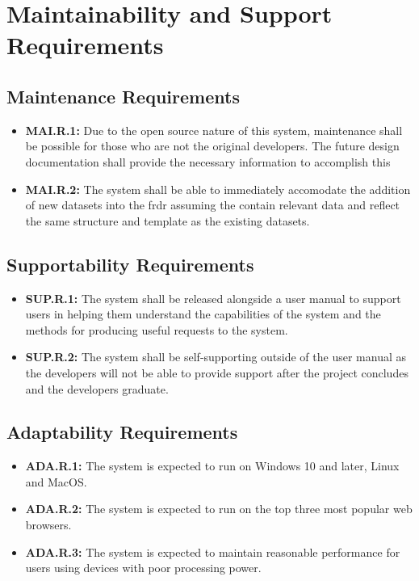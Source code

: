 \documentclass[12pt]{article}
\begin{document}
\section{Maintainability and Support Requirements}
\subsection{Maintenance Requirements}

\begin{itemize}
    \item \textbf{MAI.R.1:}\label{req:mai.r.1} Due to the open source nature of this system, maintenance shall be possible for those who are not the original developers.
    The future design documentation shall provide the necessary information to accomplish this
    \item \textbf{MAI.R.2:}\label{req:mai.r.2} The system shall be able to immediately accomodate the addition of new datasets into the \gls{frdr}
    assuming the contain relevant data and reflect the same structure and template as the existing datasets.
\end{itemize}

\subsection{Supportability Requirements}

\begin{itemize}
    \item \textbf{SUP.R.1:}\label{req:sup.r.1} The system shall be released alongside a user manual to support users in helping them understand
    the capabilities of the system and the methods for producing useful requests to the system.
    \item \textbf{SUP.R.2:}\label{req:sup.r.2} The system shall be self-supporting outside of the user manual as the developers will not be able
    to provide support after the project concludes and the developers graduate.
\end{itemize}

\subsection{Adaptability Requirements}

\begin{itemize}
    \item \textbf{ADA.R.1:}\label{req:ada.r.1} The system is expected to run on Windows 10 and later, Linux and MacOS.
    \item \textbf{ADA.R.2:}\label{req:ada.r.2} The system is expected to run on the top three most popular web browsers.
    \item \textbf{ADA.R.3:}\label{req:ada.r.3} The system is expected to maintain reasonable performance for users using devices
    with poor processing power. 

\end{itemize}
\end{document}
